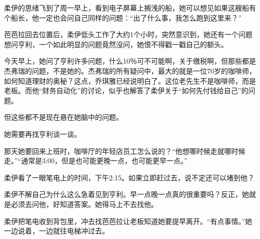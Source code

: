 柔伊的思绪飞到了周一早上，看到电子屏幕上搁浅的船，她可以想见如果这艘船有个船长，他一定也会问自己同样的问题：“出了什么事，我怎么跑到这里来？”

芭芭拉回去位置后，柔伊低头工作了大约1个小时，突然意识到，她还有一个问题想问亨利，一个如此明显的问题竟然没问，她恨不得戳一戳自己的额头。

今天早上，她问了亨利许多问题，什么10％可不可能啊，关于缴税啊，但那些都是杰弗瑞的问题，不是她的。杰弗瑞的所有疑问中，最大的就是一位70岁的咖啡师，如何知道理财的奥秘？这点，乔琪雅已经说明白了。这位老先生不是咖啡师，而是老板。而他“财务自动化”的讨论，似乎也解答了柔伊关于“如何先付钱给自己”的问题。

但这些都不是现在悬在她脑中的问题。

她需要再找亨利谈一谈。

那天她要回来上班时，咖啡厅的年轻店员工怎么说的？“他想哪时候走就哪时候走。”“通常是3:00，但是也可能更晚一点，也可能更早一点。”

柔伊看了一眼笔电上的时间，下午2:15。如果立即赶过去，说不定还可以堵到他？

柔伊不解自己为什么这么急着见到亨利。早一点晚一点真的很重要吗？反正，她就是必须去问他，好知道答案。她得马上不去找他。

柔伊把笔电收到背包里，冲去找芭芭拉让老板知道她要提早离开。“有点事情。”她一边说着，一边就往电梯冲过去。
